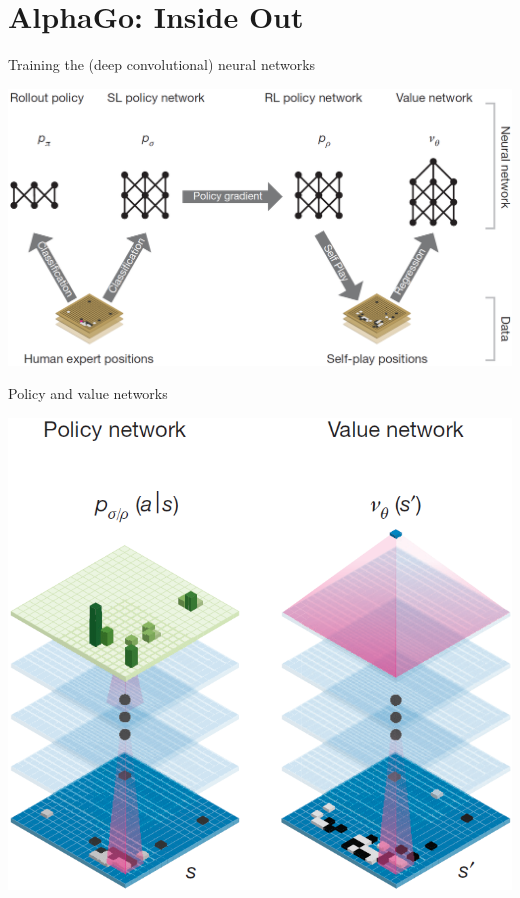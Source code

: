 \documentclass{beamer}
\begin{document}
  \section{AlphaGo: Inside Out}
  {
    \begin{frame}{Training the (deep convolutional) neural networks}
      \begin{center}
        \includegraphics[width=\textwidth]{../img/neural_nets_pipeline.png}
      \end{center}
    \end{frame}

    \begin{frame}{Policy and value networks}
      \begin{center}
        \includegraphics[height=.85\textheight]{../img/policy_and_value_network.png}
      \end{center}
    \end{frame}

}
\end{document}

